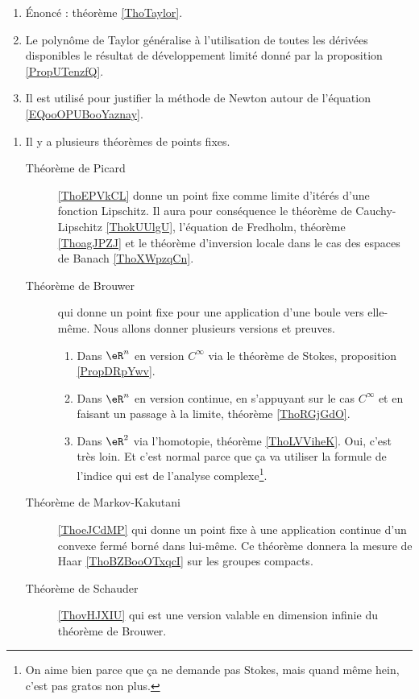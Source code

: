     \begin{enumerate}
    \item
        Énoncé : théorème \ref{ThoTaylor}.
        \item
            Le polynôme de Taylor généralise à l'utilisation de toutes les dérivées disponibles le résultat de développement limité donné par la proposition \ref{PropUTenzfQ}.
        \item
            Il est utilisé pour justifier la méthode de Newton autour de l'équation \eqref{EQooOPUBooYaznay}.
        \end{enumerate}

    \begin{enumerate}
\item 
    Il y a plusieurs théorèmes de points fixes.
    \begin{description}
        \item[Théorème de Picard] \ref{ThoEPVkCL} donne un point fixe comme limite d'itérés d'une fonction Lipschitz. Il aura pour conséquence le théorème de Cauchy-Lipschitz \ref{ThokUUlgU}, l'équation de Fredholm, théorème \ref{ThoagJPZJ} et le théorème d'inversion locale dans le cas des espaces de Banach \ref{ThoXWpzqCn}.
    \item[Théorème de Brouwer] qui donne un point fixe pour une application d'une boule vers elle-même. Nous allons donner plusieurs versions et preuves.
            \begin{enumerate}
                \item
                    Dans \( \eR^n\) en version \( C^{\infty}\) via le théorème de Stokes, proposition \ref{PropDRpYwv}.
                \item
                    Dans \( \eR^n\) en version continue, en s'appuyant sur le cas \( C^{\infty}\) et en faisant un passage à la limite, théorème \ref{ThoRGjGdO}.
                \item
                    Dans \( \eR^2\) via l'homotopie, théorème \ref{ThoLVViheK}. Oui, c'est très loin. Et c'est normal parce que ça va utiliser la formule de l'indice qui est de l'analyse complexe\footnote{On aime bien parce que ça ne demande pas Stokes, mais quand même hein, c'est pas gratos non plus.}.
            \end{enumerate}
        \item[Théorème de Markov-Kakutani]\ref{ThoeJCdMP} qui donne un point fixe à une application continue d'un convexe fermé borné dans lui-même. Ce théorème donnera la mesure de Haar \ref{ThoBZBooOTxqcI} sur les groupes compacts.
        \item[Théorème de Schauder] \ref{ThovHJXIU} qui est une version valable en dimension infinie du théorème de Brouwer. 
    \end{description}


\end{enumerate}
